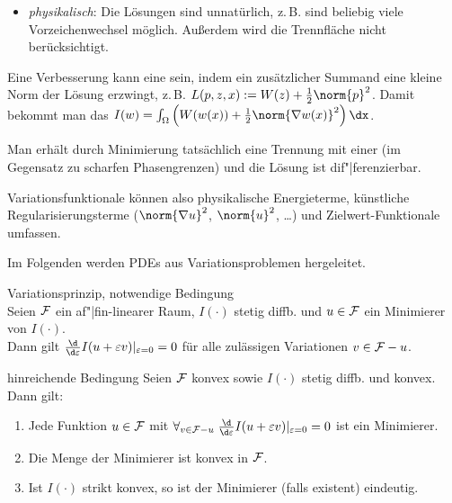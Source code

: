 \begin{Bsp}
\begin{itemize}
        \item
        \emph{physikalisch}:
        Die Lösungen sind unnatürlich, z.\,B. sind beliebig viele Vorzeichenwechsel möglich.
        Außerdem wird die Trennfläche nicht berücksichtigt.
    \end{itemize}
    
    Eine Verbesserung kann eine  sein, indem ein zusätzlicher Summand
    eine kleine Norm der Lösung erzwingt, z.\,B. $L(p, z, x) := W(z) + \frac{1}{2} \norm{p}^2$.
    Damit bekommt man das 
    $I(w) = \int_\Omega \left(W(w(x)) + \frac{1}{2} \norm{\nabla w(x)}^2\right) \dx$.
    
    Man erhält durch Minimierung tatsächlich eine Trennung mit einer
     (im Gegensatz zu scharfen Phasengrenzen) und die Lösung
    ist dif"|ferenzierbar.
\end{Bsp}

\linie

\begin{Bem}
    Variationsfunktionale können also
    physikalische Energieterme,
    künstliche Regularisierungsterme ($\norm{\nabla u}^2$, $\norm{u}^2$, \dots) und
    Zielwert-Funktionale umfassen.
\end{Bem}

\linie

\begin{Bem}
    Im Folgenden werden PDEs aus Variationsproblemen hergeleitet.
\end{Bem}

\begin{Satz}{Variationsprinzip, notwendige Bedingung}\\
    Seien $\mathcal{F}$ ein af"|fin-linearer Raum, $I(\cdot)$ stetig diffb. und $u \in \mathcal{F}$ ein Minimierer
    von $I(\cdot)$.\\
    Dann gilt $\frac{\d}{\d\varepsilon} I(u + \varepsilon v)|_{\varepsilon=0} = 0$
    für alle zulässigen Variationen $v \in \mathcal{F} - u$.
\end{Satz}

\begin{Satz}{hinreichende Bedingung}
    Seien $\mathcal{F}$ konvex sowie $I(\cdot)$ stetig diffb. und konvex.
    Dann gilt:
    \begin{enumerate}
        \item
        Jede Funktion $u \in \mathcal{F}$ mit
        $\forall_{v \in \F - u}\;
        \frac{\d}{\d\varepsilon} I(u + \varepsilon v)|_{\varepsilon=0} = 0$ ist ein Minimierer.
        
        \item
        Die Menge der Minimierer ist konvex in $\mathcal{F}$.
        
        \item
        Ist $I(\cdot)$ strikt konvex, so ist der Minimierer (falls existent) eindeutig.
    \end{enumerate}
\end{Satz}

